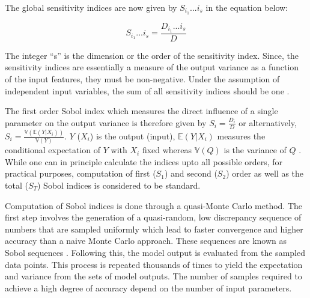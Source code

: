 \documentclass[prb,superscriptaddress,amsmath]{revtex4}
\begin{document}
The global sensitivity indices are now given by $S_{i_1}...{i_s}$ in the equation
below:

\begin{equation}
S_{i_1}...{i_s} = \frac {D_{i_1}...{i_s}}{D}
\end{equation}

The integer ``s'' is the dimension or the order of the sensitivity index.
Since, the sensitivity indices are essentially a measure of the output
variance as a function of the input features, they must be non-negative.
Under the assumption of independent input variables, the sum of all sensitivity
indices should be one \cite{Sobol01a, Glen12a}.

The first order Sobol index which measures the direct influence of a single
parameter on the output variance is therefore given by $S_i = \frac{D_i}{D}$
or alternatively, $S_i = \frac{\mathbb{V}(\mathbb{E}(Y|X_i))}{\mathbb{V}(Y)}$.
$Y$ ($X_i$) is the output (input), $\mathbb{E}(Y|X_i)$ measures the conditional
expectation of $Y$ with $X_i$ fixed whereas $\mathbb{V}(Q)$ is the variance of
$Q$ \cite{Saltelli10a}.
While one can in principle calculate the indices upto all possible orders, for
practical purposes, computation of first ($S_1$) and second ($S_2$) order as
well as the total ($S_T$)
Sobol indices is considered to be standard. 

Computation of Sobol indices is done through a quasi-Monte Carlo method. The
first step involves the generation of a quasi-random, low discrepancy sequence
of numbers that are sampled uniformly which lead to faster convergence and
higher accuracy  than a
naive Monte Carlo approach. These sequences are known as Sobol sequences \cite{Sobol67a}.
Following this, the model output is evaluated from the sampled data points.
This process is repeated thousands of times to yield the expectation and
variance from the sets of model outputs. The number of samples required to
achieve a high  degree of accuracy depend on the number of input parameters.   


\end{document}
